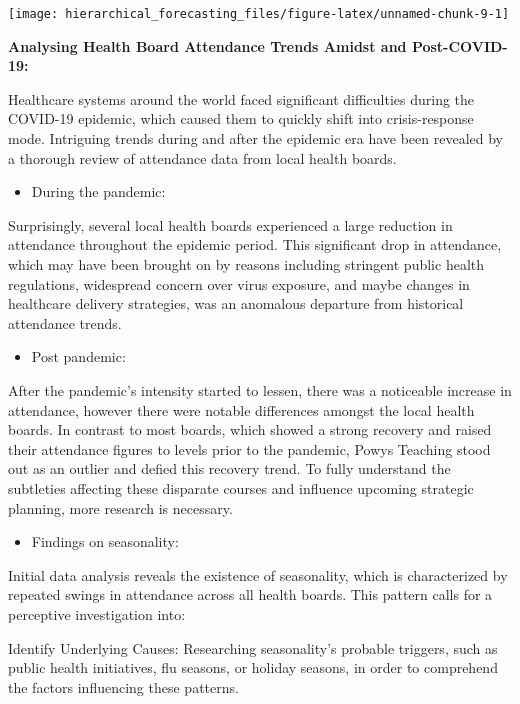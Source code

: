 \documentclass[
]{article}
\providecommand{\tightlist}{%
  \setlength{\itemsep}{0pt}\setlength{\parskip}{0pt}}
\begin{document}
\texttt{[image: hierarchical\_forecasting\_files/figure-latex/unnamed-chunk-9-1]}

\textbf{Analysing Health Board Attendance Trends Amidst and Post-COVID-19:}

Healthcare systems around the world faced significant difficulties during the COVID-19 epidemic, which caused them to quickly shift into crisis-response mode. Intriguing trends during and after the epidemic era have been revealed by a thorough review of attendance data from local health boards.

\begin{itemize}
\tightlist
\item
  During the pandemic:
\end{itemize}

Surprisingly, several local health boards experienced a large reduction in attendance throughout the epidemic period. This significant drop in attendance, which may have been brought on by reasons including stringent public health regulations, widespread concern over virus exposure, and maybe changes in healthcare delivery strategies, was an anomalous departure from historical attendance trends.

\begin{itemize}
\tightlist
\item
  Post pandemic:
\end{itemize}

After the pandemic's intensity started to lessen, there was a noticeable increase in attendance, however there were notable differences amongst the local health boards. In contrast to most boards, which showed a strong recovery and raised their attendance figures to levels prior to the pandemic, Powys Teaching stood out as an outlier and defied this recovery trend. To fully understand the subtleties affecting these disparate courses and influence upcoming strategic planning, more research is necessary.

\begin{itemize}
\tightlist
\item
  Findings on seasonality:
\end{itemize}

Initial data analysis reveals the existence of seasonality, which is characterized by repeated swings in attendance across all health boards. This pattern calls for a perceptive investigation into:

Identify Underlying Causes:
Researching seasonality's probable triggers, such as public health initiatives, flu seasons, or holiday seasons, in order to comprehend the factors influencing these patterns.
\end{document}

